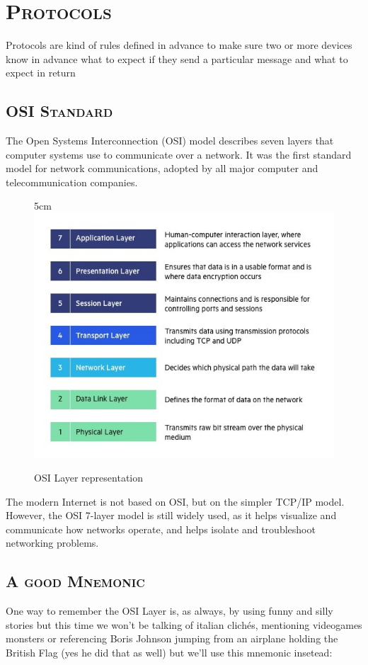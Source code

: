 \documentclass[a4paper,12pt]{book}
\begin{document}
\clearpage

\section{\textsc{Protocols}}

Protocols are kind of rules defined in advance to make sure two or more devices know in advance what to expect if they send a particular message and what to expect in return 

\subsection{\textsc{OSI Standard}}
The Open Systems Interconnection (OSI) model describes seven layers that computer systems use to communicate over a network. It was the first standard model for network communications, adopted by all major computer and telecommunication companies. %

\begin{figure}[21]{5cm}
\centering
\includegraphics[width=12cm]{./OSI-7-layers.jpg}
\caption{OSI Layer representation}\label{fig:osilayers}
\end{figure}


The modern Internet is not based on OSI, but on the simpler TCP/IP model. However, the OSI 7-layer model is still widely used, as it helps visualize and communicate how networks operate, and helps isolate and troubleshoot networking problems.


\subsection{\textsc{A good Mnemonic}}
One way to remember the OSI Layer is, as always, by using funny and silly stories but this time we won't be talking of italian clichés, mentioning videogames monsters or referencing Boris Johnson jumping from an airplane holding the British Flag (yes he did that as well) but we'll use this mnemonic insetead: 
\end{document}
